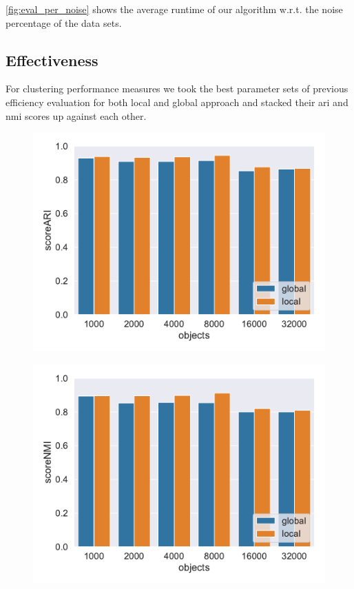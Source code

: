 \autoref{fig:eval_per_noise} shows the average runtime of our algorithm w.r.t. the noise percentage of the data sets.
 
\subsection{Effectiveness}
For clustering performance measures we took the best parameter sets of previous efficiency evaluation for both local and global approach and stacked their \gls{ari} and \gls{nmi} scores up against each other.

\begin{figure}[h]
    \centering
    \begin{minipage}[t]{.5\textwidth}
      \centering  
      \captionsetup{width=.9\linewidth}
      \includegraphics[width=\textwidth]{evaluation/Best_ARI_3D_N5_pobjects_bar.pdf}
      \label{fig:ariperpts}
    \end{minipage}%
    \begin{minipage}[t]{.5\textwidth}
      \centering
      \captionsetup{width=.9\linewidth}
      \includegraphics[width=\textwidth]{evaluation/Best_NMI_3D_N5_pobjects_bar.pdf}
      \label{fig:nmiperpts}
    \end{minipage}
\end{figure}
